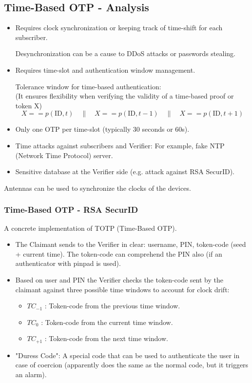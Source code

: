 \subsection*{Time-Based OTP - Analysis}
\begin{itemize}
    \item Requires clock synchronization or keeping track of time-shift for each subscriber.
    
    Desynchronization can be a cause to DDoS attacks or passwords stealing.
    \item Requires time-slot and authentication window management.
    
    Tolerance window for time-based authentication:
    \\\hspace*{1cm}(It ensures flexibility when verifying the validity of a time-based proof or token  X)
    \[
        X==p(\text{ID}, t) \quad \| \quad X == p(\text{ID}, t-1) \quad \| \quad X == p(\text{ID}, t+1)
    \]
    \item Only one OTP per time-slot (typically 30 seconds or 60s).
    \item Time attacks against subscribers and Verifier: For example, fake NTP (Network Time Protocol) server.
    \item Sensitive database at the Verifier side  (e.g. attack against RSA SecurID).
\end{itemize}
\begin{tcolorbox}[colback=blue!10!white, colframe=blue!50!white]
Antennas can be used to synchronize the clocks of the devices.
\end{tcolorbox}

\subsubsection*{Time-Based OTP - RSA SecurID}
\begin{center}
    A concrete implementation of TOTP (Time-Based OTP).
\end{center}
\begin{itemize}
    \item The Claimant sends to the Verifier in clear: username, PIN, token-code (seed + current time). The token-code can comprehend the PIN also (if an authenticator with pinpad is used).
    \item Based on user and PIN the Verifier checks the token-code sent by the claimant against three possible time windows to account for clock drift:
    \begin{itemize}
        \item  $TC_{-1}$ : Token-code from the previous time window.
        \item $TC_0$ : Token-code from the current time window.
        \item $TC_{+1}$ : Token-code from the next time window.
    \end{itemize}
    \item "Duress Code": A special code that can be used to authenticate the user in case of coercion (apparently does the same as the normal code, but it triggers an alarm).
\end{itemize}
